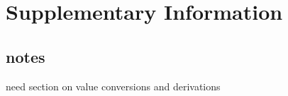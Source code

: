 
\section*{Supplementary Information}

\subsection{notes}
	need section on value conversions and derivations